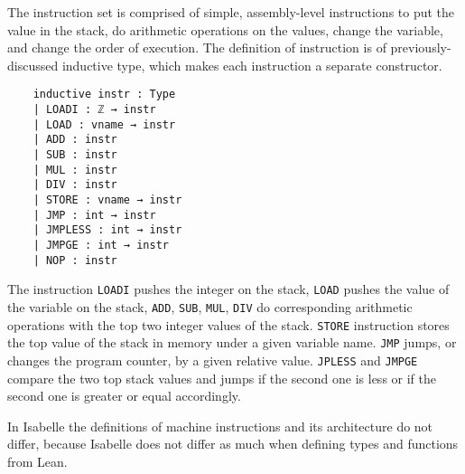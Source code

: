 The instruction set is comprised of simple, assembly-level instructions to put the value in the stack, do arithmetic operations on the values, change the variable, and change the order of execution. The definition of instruction is of previously-discussed inductive type, which makes each instruction a separate constructor.  
\begin{lstlisting}
    inductive instr : Type
    | LOADI : ℤ → instr
    | LOAD : vname → instr 
    | ADD : instr
    | SUB : instr
    | MUL : instr
    | DIV : instr
    | STORE : vname → instr
    | JMP : int → instr
    | JMPLESS : int → instr
    | JMPGE : int → instr
    | NOP : instr
\end{lstlisting}
The instruction \lstinline{LOADI} pushes the integer on the stack, \lstinline{LOAD} pushes the value of the variable on the stack, \lstinline{ADD}, \lstinline{SUB}, \lstinline{MUL}, \lstinline{DIV} do corresponding arithmetic operations with the top two integer values of the stack. \lstinline{STORE} instruction stores the top value of the stack in memory under a given variable name. \lstinline{JMP} jumps, or changes the program counter, by a given relative value. \lstinline{JPLESS} and \lstinline{JMPGE} compare the two top stack values and jumps if the second one is less or if the second one is greater or equal accordingly. 

In Isabelle the definitions of machine instructions and its architecture do not differ, because Isabelle does not differ as much when defining types and functions from Lean.